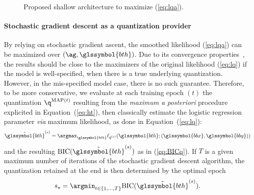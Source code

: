 \begin{figure}[!ht]
\caption{Proposed shallow architecture to maximize (\ref{eq:lqa}).}
\label{fig:nn}
\end{figure}


\paragraph{Stochastic gradient descent as a quantization provider}

By relying on stochastic gradient ascent, the smoothed likelihood (\ref{eq:lqa}) can be maximized over $\left(\ag, \glssymbol{bth} \right)$. Due to its convergence properties~\cite{bottou2010large}, the results should be close to the maximizers of the original likelihood (\ref{eq:lq}) if the model is well-specified, when there is a true underlying quantization. However, in the mis-specified model case, there is no such guarantee. Therefore, to be more conservative, we evaluate at each training epoch $(t)$ the quantization ${\q}^{\text{MAP}(t)}$ resulting from the \textit{maximum a posteriori} procedure explicited in Equation~(\ref{eq:ht}), then classically estimate the logistic regression parameter \textit{via} maximum likelihood, as done in Equation~(\ref{eq:lq}):
\[\hat{\glssymbol{bth}}^{(s)} = \argmax_{\glssymbol{bth}} \ell_{\hat{q}^{(s)}}(\glssymbol{bth}; (\glssymbol{bbx},\glssymbol{bby}))\]
and the resulting $\mbox{BIC}(\hat{\glssymbol{bth}}^{(s)})$ as in (\ref{eq:BICq}). If $T$ is a given maximum number of iterations of the stochastic gradient descent algorithm, the quantization retained at the end is then determined by the optimal epoch
\begin{equation} \label{eq:opt_epoch}
s_\star=\argmin_{t\in \{1,\ldots, T\}} \mbox{BIC}(\hat{\glssymbol{bth}}^{(s)}).
\end{equation}

